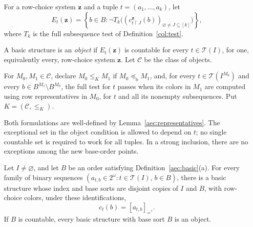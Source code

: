 For a row-choice system \(\mathbf z\) and a tuple
\(t=(a_1,\ldots,a_k)\), let
\begin{equation}\label{aec:bad-set}
 E_t(\mathbf z)=
 \left\{b\in B:
 \neg T_k\bigl((c_{t\restriction J}^{\mathbf z}(b))_{\varnothing\ne J\subseteq[k]}\bigr)
 \right\},
\end{equation}
where \(T_k\) is the full subsequence test of
Definition~\ref{col:test}.

\begin{definition}\label{aec:objects}
A basic structure is an \emph{object} if \(E_t(\mathbf z)\) is
countable for every \(t\in\mathcal T(I)\), for one, equivalently
every, row-choice system \(\mathbf z\).
Let \(\mathcal C\) be the class of objects.

For \(M_0,M_1\in\mathcal C\), declare \(M_0\le_K M_1\) if
\(M_0\preccurlyeq_{\mathrm b}M_1\), and, for every
\(t\in\mathcal T(I^{M_0})\) and every
\(b\in B^{M_1}\setminus B^{M_0}\), the full test for \(t\)
passes when its colors in \(M_1\) are computed using row
representatives in \(M_0\), for \(t\) and all its nonempty
subsequences.  Put \(K=(\mathcal C,\le_K)\).
\end{definition}

Both formulations are well-defined by
Lemma~\ref{aec:representatives}.  The exceptional set in the
object condition is allowed to depend on \(t\); no single
countable set is required to work for all tuples.  In a strong
inclusion, there are no exceptions among the new base-order
points.

\begin{lemma}\label{aec:arrays}
Let \(I\ne\varnothing\), and let \(B\) be an order satisfying
Definition~\ref{aec:basic}(a).  For every family of binary
sequences
\((a_{t,b}\in 2^\omega:t\in\mathcal T(I),\,b\in B)\),
there is a basic structure whose index and base sorts are disjoint
copies of \(I\) and \(B\), with row-choice colors, under these
identifications,
\[
 c_t(b)=[a_{t,b}]_{=^*}.
\]
If \(B\) is countable, every basic structure with base sort
\(B\) is an object.
\end{lemma}

